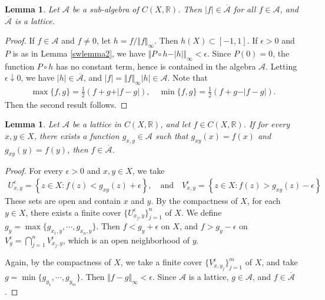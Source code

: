 \documentclass{article}
\numberwithin{equation}{section}
\newcommand{\bbR}{\mathbb{R}}
\renewcommand{\cal}{\mathcal}
\newcommand{\ol}{\overline}
\theoremstyle{plain}
\newtheorem{lemma}[theorem]{Lemma}
\theoremstyle{definition}
\begin{document}
\begin{lemma}\label{swlemma3}
Let $\cal{A}$ be a sub-algebra of $C(X,\bbR)$. Then $\vert f\vert\in\ol{\cal{A}}$ for all $f\in\cal{A}$, and $\ol{\cal{A}}$ is a lattice.
\end{lemma}
\begin{proof}
If $f\in\cal{A}$ and $f\neq 0$, let $h=f/\Vert f\Vert_\infty$. Then $h(X)\subset[-1,1]$. If $\epsilon>0$ and $P$ is as in Lemma \ref{swlemma2}, we have $\Vert P\circ h-\vert h\vert\Vert_\infty<\epsilon$. Since $P(0)=0$, the function $P\circ h$ has no constant term, hence is contained in the algebra $\cal{A}$. Letting $\epsilon\downarrow 0$, we have $\vert h\vert\in\ol{\cal{A}}$, and $\vert f\vert=\Vert f\Vert_\infty\vert h\vert\in\cal{A}$. Note that
\begin{align*}
	\max\{f,g\}=\frac{1}{2}\left(f+g+\vert f-g\vert\right),\quad \min\{f,g\}=\frac{1}{2}\left(f+g-\vert f-g\vert\right).
\end{align*}
Then the second result follows.
\end{proof}

\begin{lemma}\label{swlemma4}
Let $\cal{A}$ be a lattice in $C(X,\bbR)$, and let $f\in C(X,\bbR)$. If for every $x,y\in X$, there exists a function $g_{x,y}\in\cal{A}$ such that $g_{xy}(x)=f(x)$ and $g_{xy}(y)=f(y)$, then $f\in\ol{\cal{A}}$.
\end{lemma}
\begin{proof}
For every $\epsilon>0$ and $x,y\in X$, we take
\begin{align*}
	U_{x,y}^\epsilon=\left\{z\in X:f(z)<g_{xy}(z)+\epsilon\right\},\quad\text{and}\quad V_{x,y}^\epsilon=\left\{z\in X:f(z)> g_{xy}(z)-\epsilon\right\}
\end{align*}
These sets are open and contain $x$ and $y$. By the compactness of $X$, for each $y\in X$, there exists a finite cover $\{U_{x_j,y}^\epsilon\}_{j=1}^n$ of $X$. We define $g_y=\max\{g_{x_1,y},\cdots,g_{x_n,y}\}$. Then $f<g_y+\epsilon$ on $X$, and $f>g_y-\epsilon$ on $V_y^\epsilon=\bigcap_{j=1}^n V_{x_j,y}^\epsilon$, which is an open neighborhood of $y$. 

Again, by the compactness of $X$, we take a finite cover $\{V_{x,y_j}^\epsilon\}_{j=1}^m$ of $X$, and take $g=\min\{g_{y_1},\cdots,g_{y_m}\}$. Then $\Vert f-g\Vert_\infty<\epsilon$. Since $\cal{A}$ is a lattice, $g\in\cal{A}$, and $f\in\ol{\cal{A}}$.
\end{proof}
\end{document}
